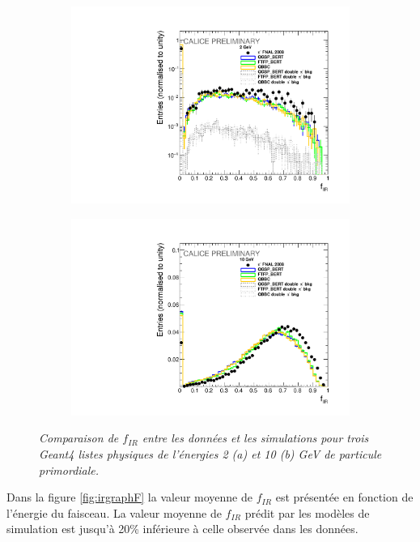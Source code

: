 \begin{figure}
	\centering
	\begin{subfigure}{0.5\textwidth}
		\centering
		\includegraphics[width=.90\linewidth]{ECAL/plots/e-ir-2.pdf}
		\caption{\label{fig:efr2F} }
	\end{subfigure}%
	\begin{subfigure}{0.5\textwidth}
		\centering
		\includegraphics[width=.90\linewidth]{ECAL/plots/e-ir-10.pdf}
		\caption{\label{fig:efr10F} }
	\end{subfigure}
	\caption{\label{fig:irexampleF} \sl%
		Comparaison de $f_{IR}$ entre les données et les simulations pour trois {\sc Geant}4  listes physiques de l'\'energies 2 (a) et 10 (b) GeV de particule primordiale.}
\end{figure}

Dans la figure \ref{fig:irgraphF} la valeur moyenne de $f_ {IR}$ est présentée en fonction de l'énergie du faisceau.%
La valeur moyenne de $f_{IR}$ prédit par les modèles de simulation est jusqu'à 20\% inférieure à celle observée dans les données.

